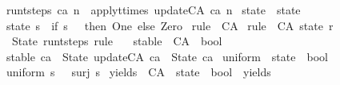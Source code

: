 \begin{isabellebody}
{\isachardoublequoteopen}run{\isacharunderscore}t{\isacharunderscore}steps\ ca\ n\ {\isacharequal}\ apply{\isacharunderscore}t{\isacharunderscore}times\ update{\isacharunderscore}CA\ ca\ n{\isachardoublequoteclose}%
\isadelimdocument
%
\endisadelimdocument
%
\isatagdocument
%
\isamarkuptrue%
%
\endisatagdocument
{\isafolddocument}%
%
\isadelimdocument
%
\endisadelimdocument
{}\isamarkupfalse%
\ state{}\ {\isacharcolon}{\isacharcolon}\ state\ \isanewline
{\isachardoublequoteopen}state{}\ s\ {\isasymequiv}\ {\isacharparenleft}if\ s\ {\isacharequal}\ {}\ then\ One\ else\ Zero{\isacharparenright}{\isachardoublequoteclose}\isanewline
\isanewline
{}\isamarkupfalse%
\ rule{}{}{}\ {\isacharcolon}{\isacharcolon}\ CA\ \isanewline
{\isachardoublequoteopen}rule{}{}{}\ {\isasymequiv}\ CA\ state{}\ r{}{}{}{\isachardoublequoteclose}\isanewline
\isanewline
{}\isamarkupfalse%
\ {\isachardoublequoteopen}State\ {\isacharparenleft}run{\isacharunderscore}t{\isacharunderscore}steps\ rule{}{}{}\ {}{\isacharparenright}\ {\isacharparenleft}{\isacharminus}{}{\isacharparenright}{\isachardoublequoteclose}%
\isadelimdocument
%
\endisadelimdocument
%
\isatagdocument
%
\isamarkuptrue%
%
\endisatagdocument
{\isafolddocument}%
%
\isadelimdocument
%
\endisadelimdocument
{}\isamarkupfalse%
\ stable\ {\isacharcolon}{\isacharcolon}\ {\isachardoublequoteopen}CA\ {\isasymRightarrow}\ bool{\isachardoublequoteclose}\ \isanewline
{\isachardoublequoteopen}stable\ ca\ {\isasymequiv}\ State\ {\isacharparenleft}update{\isacharunderscore}CA\ ca{\isacharparenright}\ {\isacharequal}\ State\ ca{\isachardoublequoteclose}\isanewline
\isanewline
\isanewline
{}\isamarkupfalse%
\ uniform\ {\isacharcolon}{\isacharcolon}\ {\isachardoublequoteopen}state\ {\isasymRightarrow}\ bool{\isachardoublequoteclose}\ \isanewline
{\isachardoublequoteopen}uniform\ s\ {\isasymequiv}\ {\isasymnot}\ {\isacharparenleft}surj\ s{\isacharparenright}{\isachardoublequoteclose}\isanewline
\isanewline
{}\isamarkupfalse%
\ yields\ {\isacharcolon}{\isacharcolon}\ {\isachardoublequoteopen}CA\ {\isasymRightarrow}\ state\ {\isasymRightarrow}\ bool{\isachardoublequoteclose}\ {\isacharparenleft}\ {\isacartoucheopen}yields{\isacartoucheclose}\ \ {}{}{\isacharparenright}\ \isanewline

\end{isabellebody}

